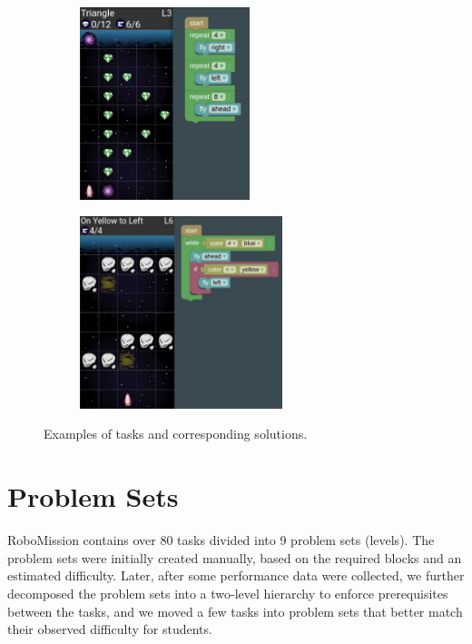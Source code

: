 \begin{figure}[htb]
\centering
\begin{subfigure}[t]{0.5\textwidth}
\centering
\includegraphics[height=56mm]{img/robomission-task-repeat}
\end{subfigure}%
\begin{subfigure}[t]{0.5\textwidth}
\centering
\includegraphics[height=56mm]{img/robomission-task-conditions}
\end{subfigure}
\caption{Examples of tasks and corresponding solutions.}
\label{fig:tasks-solutions}
\end{figure}



\section{Problem Sets}



RoboMission contains over 80 tasks divided into 9 problem sets (levels).
The problem sets were initially created manually, based on the required blocks
and an estimated difficulty. Later, after some performance data
were collected, we further decomposed the problem sets into a two-level
hierarchy to enforce prerequisites between the tasks, and we moved
a few tasks into problem sets that better match their observed
difficulty for students.


